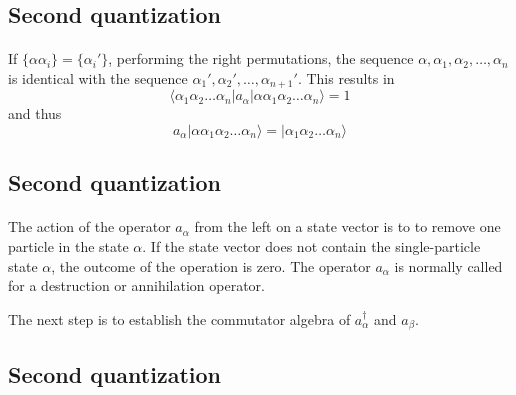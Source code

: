 \documentclass[%
twoside,                 %
final,                   %
10pt]{article}
\begin{document}
\subsection*{Second quantization}

\paragraph{}
If $\{\alpha\alpha_i\} = \{\alpha_i'\}$, performing the right permutations, the sequence
$\alpha ,\alpha_1, \alpha_2, \dots, \alpha_n$ is identical with the sequence
$\alpha_1', \alpha_2', \dots, \alpha_{n+1}'$. This results in
\begin{equation}
	\langle\alpha_1\alpha_2 \dots \alpha_n|a_\alpha|\alpha\alpha_1\alpha_2 \dots \alpha_{n}\rangle = 1 \label{eq:2-14}
\end{equation}
and thus
\begin{equation}
	a_\alpha |\alpha\alpha_1\alpha_2 \dots \alpha_{n}\rangle = |\alpha_1\alpha_2 \dots \alpha_{n}\rangle \label{eq:2-15}
\end{equation}




\subsection*{Second quantization}

\paragraph{}
The action of the operator 
$a_\alpha$ from the left on a state vector  is to to remove  one particle in the state
$\alpha$. 
If the state vector does not contain the single-particle state $\alpha$, the outcome of the operation is zero.
The operator  $a_\alpha$ is normally called for a destruction or annihilation operator.

The next step is to establish the  commutator algebra of $a_\alpha^{\dagger}$ and
$a_\beta$.




\subsection*{Second quantization}

\end{document}
